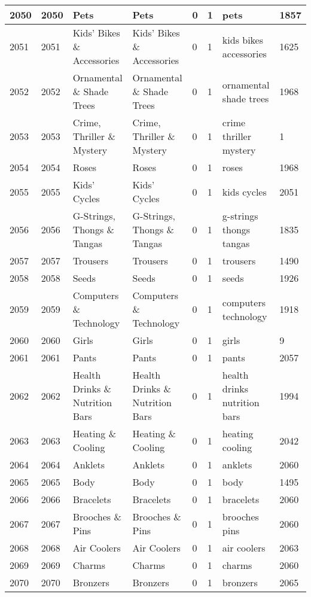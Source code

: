 \begin{longtable}{|l|l|l|l|l|l|l|l|}
2050 & 2050 & Pets & Pets & 0 & 1 & pets & 1857 \\ \hline 
2051 & 2051 & Kids' Bikes \& Accessories & Kids' Bikes \& Accessories & 0 & 1 & kids bikes accessories & 1625 \\ \hline 
2052 & 2052 & Ornamental \& Shade Trees & Ornamental \& Shade Trees & 0 & 1 & ornamental shade trees & 1968 \\ \hline 
2053 & 2053 & Crime, Thriller \& Mystery & Crime, Thriller \& Mystery & 0 & 1 & crime thriller mystery & 1 \\ \hline 
2054 & 2054 & Roses & Roses & 0 & 1 & roses & 1968 \\ \hline 
2055 & 2055 & Kids' Cycles & Kids' Cycles & 0 & 1 & kids cycles & 2051 \\ \hline 
2056 & 2056 & G-Strings, Thongs \& Tangas & G-Strings, Thongs \& Tangas & 0 & 1 & g-strings thongs tangas & 1835 \\ \hline 
2057 & 2057 & Trousers & Trousers & 0 & 1 & trousers & 1490 \\ \hline 
2058 & 2058 & Seeds & Seeds & 0 & 1 & seeds & 1926 \\ \hline 
2059 & 2059 & Computers \& Technology & Computers \& Technology & 0 & 1 & computers technology & 1918 \\ \hline 
2060 & 2060 & Girls & Girls & 0 & 1 & girls & 9 \\ \hline 
2061 & 2061 & Pants & Pants & 0 & 1 & pants & 2057 \\ \hline 
2062 & 2062 & Health Drinks \& Nutrition Bars & Health Drinks \& Nutrition Bars & 0 & 1 & health drinks nutrition bars & 1994 \\ \hline 
2063 & 2063 & Heating \& Cooling & Heating \& Cooling & 0 & 1 & heating cooling & 2042 \\ \hline 
2064 & 2064 & Anklets & Anklets & 0 & 1 & anklets & 2060 \\ \hline 
2065 & 2065 & Body & Body & 0 & 1 & body & 1495 \\ \hline 
2066 & 2066 & Bracelets & Bracelets & 0 & 1 & bracelets & 2060 \\ \hline 
2067 & 2067 & Brooches \& Pins & Brooches \& Pins & 0 & 1 & brooches pins & 2060 \\ \hline 
2068 & 2068 & Air Coolers & Air Coolers & 0 & 1 & air coolers & 2063 \\ \hline 
2069 & 2069 & Charms & Charms & 0 & 1 & charms & 2060 \\ \hline 
2070 & 2070 & Bronzers & Bronzers & 0 & 1 & bronzers & 2065 \\ \hline 

\end{longtable}
